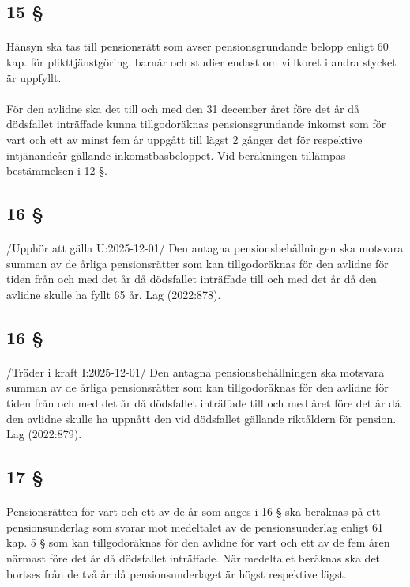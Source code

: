 \documentclass[a4paper,notitlepage,openany,10pt]{book}
\begin{document}
\subsection*{15 §}
\paragraph*{}
Hänsyn ska tas till pensionsrätt som avser pensionsgrundande belopp enligt 60 kap. för plikttjänstgöring, barnår och studier endast om villkoret i andra stycket är uppfyllt.
\paragraph*{}
För den avlidne ska det till och med den 31 december året före det år då dödsfallet inträffade kunna tillgodoräknas pensionsgrundande inkomst som för vart och ett av minst fem år uppgått till lägst 2 gånger det för respektive intjänandeår gällande inkomstbasbeloppet. Vid beräkningen tillämpas bestämmelsen i 12 §.
\subsection*{16 §}
\paragraph*{}
/Upphör att gälla U:2025-12-01/
Den antagna pensionsbehållningen ska motsvara summan av de årliga pensionsrätter som kan tillgodoräknas för den avlidne för tiden från och med det år då dödsfallet inträffade till och med det år då den avlidne skulle ha fyllt 65 år.
Lag (2022:878).
\subsection*{16 §}
\paragraph*{}
/Träder i kraft I:2025-12-01/
Den antagna pensionsbehållningen ska motsvara summan av de årliga pensionsrätter som kan tillgodoräknas för den avlidne för tiden från och med det år då dödsfallet inträffade till och med året före det år då den avlidne skulle ha uppnått den vid dödsfallet gällande riktåldern för pension.
Lag (2022:879).
\subsection*{17 §}
\paragraph*{}
Pensionsrätten för vart och ett av de år som anges i 16 § ska beräknas på ett pensionsunderlag som svarar mot medeltalet av de pensionsunderlag enligt 61 kap. 5 § som kan tillgodoräknas för den avlidne för vart och ett av de fem åren närmast före det år då dödsfallet inträffade.
När medeltalet beräknas ska det bortses från de två år då pensionsunderlaget är högst respektive lägst.
\end{document}
